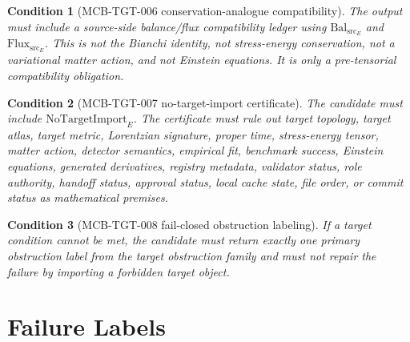 \documentclass[11pt]{article}
\newcommand{\NoTargetImport}{\mathrm{NoTargetImport}}
\newcommand{\BalSrc}{\mathrm{Bal}_{\mathrm{src}}}
\newcommand{\FluxSrc}{\mathrm{Flux}_{\mathrm{src}}}
\newtheorem{condition}{Condition}
\begin{document}
\begin{condition}[MCB-TGT-006 conservation-analogue compatibility]
The output must include a source-side balance/flux compatibility ledger using
\(\BalSrc_E\) and \(\FluxSrc_E\). This is not the Bianchi identity, not
stress-energy conservation, not a variational matter action, and not Einstein
equations. It is only a pre-tensorial compatibility obligation.
\end{condition}

\begin{condition}[MCB-TGT-007 no-target-import certificate]
The candidate must include \(\NoTargetImport_E\). The certificate must rule
out target topology, target atlas, target metric, Lorentzian signature,
proper time, stress-energy tensor, matter action, detector semantics,
empirical fit, benchmark success, Einstein equations, generated derivatives,
registry metadata, validator status, role authority, handoff status,
approval status, local cache state, file order, or commit status as
mathematical premises.
\end{condition}

\begin{condition}[MCB-TGT-008 fail-closed obstruction labeling]
If a target condition cannot be met, the candidate must return exactly one
primary obstruction label from the target obstruction family and must not
repair the failure by importing a forbidden target object.
\end{condition}

\section{Failure Labels}
\end{document}
